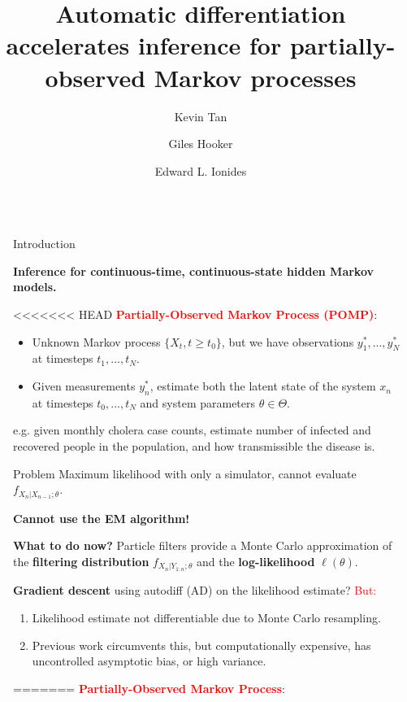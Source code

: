 \documentclass[final]{beamer}
\title{Automatic differentiation accelerates inference
for partially-observed Markov processes}
\author{Kevin Tan \inst{*} \and Giles Hooker \inst{*} \and Edward L. Ionides \inst{\cross[.4pt]$\cdot$}}
\institute[shortinst]{\inst{*} Department of Statistics and Data Science, University of Pennsylvania \quad  \inst{\cross[.4pt]} Department of Statistics, University of Michigan}
\newlength{\sepwidth}
\newlength{\colwidth}
\newcommand{\separatorcolumn}{\begin{column}{\sepwidth}\end{column}}
\begin{document}
\begin{frame}[t]
\begin{columns}[t]
\separatorcolumn

\begin{column}{\colwidth}

  \begin{block}{Introduction}
  
\textbf{Inference for continuous-time, continuous-state hidden Markov models.}

\begin{tcolorbox}[enhanced,colback=white!100!white,colframe=red!100!red]
<<<<<<< HEAD
\textbf{\textcolor{red}{Partially-Observed Markov Process (POMP)}}: 
\begin{itemize}
    \item Unknown Markov process $\{X_t, t \geq t_0\}$, but we have observations $y_1^*,...,y_N^*$ at timesteps $t_1,..., t_N$.  
    \item Given measurements $y_n^*$, estimate both the latent state of the system $x_n$ at timesteps $t_0,...,t_N$ and system parameters $\theta \in \Theta$. 
\end{itemize}
\end{tcolorbox}
e.g. given monthly cholera case counts, estimate number of infected and recovered people in the population, and how transmissible the disease is. 

  \end{block}
  
  \begin{block}{Problem}
  Maximum likelihood with only a simulator, cannot evaluate $f_{X_n|X_{n-1};\theta}$.

  \begin{tcolorbox}[enhanced,colback=white!100!white,colframe=red!100!red]
  \begin{center}
      \textbf{Cannot use the EM algorithm!}
  \end{center}
\end{tcolorbox}

  \textbf{What to do now?} Particle filters provide a Monte Carlo approximation of the \textbf{filtering distribution} $f_{X_n|Y_{1:n};\theta}$ and the \textbf{log-likelihood} $\ell(\theta)$.
  
  \textbf{Gradient descent} using autodiff (AD) on the likelihood estimate? \textcolor{red}{But:}
  \begin{enumerate}
      \item Likelihood estimate not differentiable due to Monte Carlo resampling.
      \item Previous work \cite{corenflos21, naesseth18, scibior21} circumvents this, but computationally expensive, has uncontrolled asymptotic bias, or high variance. 
  \end{enumerate}
=======
\textbf{\textcolor{red}{Partially-Observed Markov Process}}: 


\end{block}
\end{column}
\end{columns}
\end{frame}
\end{document}
